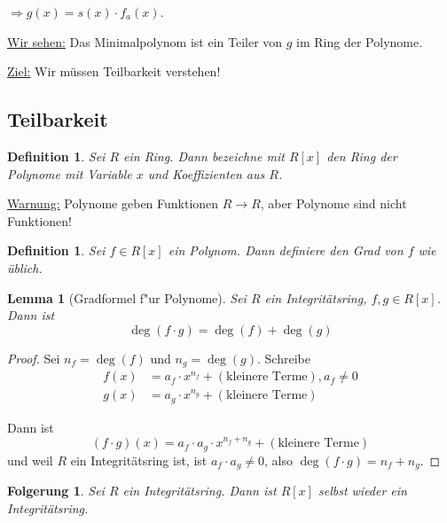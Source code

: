 \documentclass[a4paper,12pt,numbers=noenddot,parskip=full]{scrartcl}
\newcommand{\heading}{\underline}
\theoremstyle{dotless}
\newtheorem{corollary}[theorem]{Folgerung}
\newtheorem{lemma}[theorem]{Lemma}
\newtheorem{definition}[theorem]{Definition}
\theoremstyle{remark}
\begin{document}
 	$\Rightarrow g(x) = s(x) \cdot f_a(x)$.
 	
 	\heading{Wir sehen:} Das Minimalpolynom ist ein Teiler von $g$ im Ring der Polynome.
 	
 	\heading{Ziel:} Wir müssen Teilbarkeit verstehen!
 	
 	\subsection{Teilbarkeit}
 	
 	\begin{definition}
 		Sei $R$ ein Ring. Dann bezeichne mit $R[x]$ den Ring der Polynome mit Variable $x$ und Koeffizienten aus $R$.
 	\end{definition}
 
 	\heading{Warnung:} Polynome geben Funktionen $R \to R$, aber Polynome sind nicht Funktionen!
 	
 	\begin{definition}
 		Sei $f \in R[x]$ ein Polynom. Dann definiere den Grad von $f$ wie üblich.
 	\end{definition}
 
 	\begin{lemma}[Gradformel f"ur Polynome]
 		Sei $R$ ein Integritätsring, $f,g \in R[x]$. Dann ist
 		\begin{equation*}
	 		\deg(f \cdot g) = \deg(f) + \deg(g)
 		\end{equation*}
 	\end{lemma}
 
 	\begin{proof}
 		Sei $n_f = \deg(f)$ und $n_g = \deg(g)$. Schreibe
 		\begin{align*}
	 		f(x) &= a_f \cdot x^{n_f} + (\text{kleinere Terme}), a_f \neq 0 \\
	 		g(x) &= a_g \cdot x^{n_g} + (\text{kleinere Terme})
 		\end{align*}
 		
 		Dann ist
 		\begin{equation*}
 			(f \cdot g)(x) = a_f \cdot a_g \cdot x^{n_f + n_g} + (\text{kleinere Terme})
 		\end{equation*}
 		und weil $R$ ein Integritätsring ist, ist $a_f \cdot a_g \neq 0$, also $\deg(f \cdot g) = n_f + n_g$.
 	\end{proof}
 
 	\begin{corollary}
 		Sei $R$ ein Integritätsring. Dann ist $R[x]$ selbst wieder ein Integritätsring.
 	\end{corollary}
 
\end{document}
